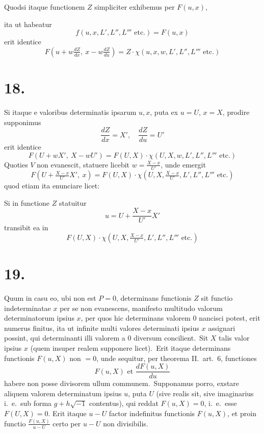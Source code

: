 \documentclass[12pt,a4paper]{article}
\theoremstyle{plain}
\begin{document}
Quodsi itaque functionem $Z$ simpliciter exhibemus per $F(u, x)$,

ita ut habeatur
\[
f(u, x, L', L'', L''' \text{ etc.}) = F(u, x)
\]
erit identice
\[
F(u + w\tfrac{dZ}{dx},\ x - w\tfrac{dZ}{du}) = Z \cdot \chi(u, x, w, L', L'', L''' \text{ etc.})
\]

\section*{18.}

Si itaque e valoribus determinatis ipsarum $u, x$, puta ex $u = U$, $x = X$,
prodire supponimus
\[
\frac{dZ}{dx} = X', \quad \frac{dZ}{du} = U'
\]
erit identice
\[
F(U + wX',\ X - wU') = F(U, X) \cdot \chi(U, X, w, L', L'', L''' \text{ etc.})
\]
Quoties $V$ non evanescit, statuere licebit $w = \frac{X - x}{U'}$,
unde emergit
\[
F(U + \tfrac{X - x}{U'}X',\ x) = F(U, X) \cdot \chi(U, X, \tfrac{X - x}{U'}, L', L'', L''' \text{ etc.})
\]
quod etiam ita enunciare licet:

Si in functione $Z$ statuitur
\[
u = U + \frac{X - x}{U'}X'
\]
transibit ea in
\[
F(U, X) \cdot \chi(U, X, \tfrac{X - x}{U'}, L', L'', L''' \text{ etc.})
\]

\section*{19.}

Quum in casu eo, ubi non est $P = 0$, determinans functionis $Z$ sit
functio indeterminatae $x$ per se non evanescens, manifesto multitudo valorum determinatorum ipsius $x$, per quos hic determinans valorem $0$ nancisci potest, erit
numerus finitus, ita ut infinite multi valores determinati ipsius $x$ assignari possint,
qui determinanti illi valorem a $0$ diversum concilient.\ Sit $X$ talis valor
ipsius $x$ (quem insuper realem supponere licet).\ Erit itaque determinans functionis $F(u, X)$ non $= 0$,
unde sequitur, per theorema II.\ art.\ 6, functiones
\[
F(u, X) \text{ et } \frac{dF(u, X)}{du}
\]
habere non posse divisorem ullum communem.\ Supponamus porro, exstare aliquem
valorem determinatum ipsius $u$, puta $U$ (sive realis sit, sive imaginarius i.\ e.\ sub
forma $g + h\sqrt{-1}$ contentus), qui reddat $F(u, X) = 0$, i.\ e.\ esse $F(U, X) = 0$.
Erit itaque $u - U$ factor indefinitus functionis $F(u, X)$, et proin functio
$\frac{F(u, X)}{u - U}$ certo per $u - U$ non divisibilis.
\end{document}
